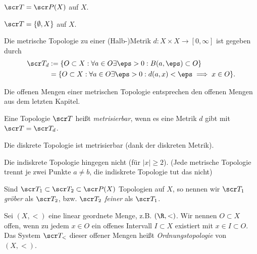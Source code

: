 \begin{ex}
	$\scr T = \scr P(X)$ auf $X$.
\end{ex}

\begin{ex}
	$\scr T = \{\emptyset, X\}$ auf $X$.
\end{ex}

\begin{ex} \label{ex:metric_topology}
	Die metrische Topologie zu einer (Halb-)Metrik $d: X \times X \to [0,\infty]$ ist gegeben durch
	\begin{align*}
		\scr T_d
		&:= \{ O \subset X : \forall a \in O \exists \eps > 0 : B(a,\eps) \subset O \} \\
		&= \{ O \subset X : \forall a \in O \exists \eps > 0 : d(a,x) < \eps \implies x \in O \}.
	\end{align*}
\end{ex}

\begin{nt}
	Die offenen Mengen einer metrischen Topologie entsprechen den offenen Mengen aus dem letzten Kapitel.
\end{nt}

\begin{df}
	Eine Topologie $\scr T$ heißt \emph{metrisierbar}, wenn es eine Metrik $d$ gibt mit $\scr T = \scr T_d$.
\end{df}

\begin{ex}
	Die diskrete Topologie ist metrisierbar (dank der diskreten Metrik).

	Die indiskrete Topologie hingegen nicht (für $|x| \ge 2$).
	(Jede metrische Topologie trennt je zwei Punkte $a \neq b$, die indiskrete Topologie tut das nicht)
\end{ex}

\begin{df}
	Sind $\scr T_1 \subset \scr T_2 \subset \scr P(X)$ Topologien auf $X$, so nennen wir $\scr T_1$ \emph{gröber} als $\scr T_2$, bzw. $\scr T_2$ \emph{feiner} als $\scr T_1$.
\end{df}

\begin{ex}[Ordnungstopologie]
	Sei $(X,<)$ eine linear geordnete Menge, z.B. $(\R,<)$.
	Wir nennen $O \subset X$ offen, wenn zu jedem $x \in O$ ein offenes Intervall $I \subset X$ existiert mit $x \in I \subset O$.
	Das System $\scr T_<$ dieser offener Mengen heißt \emph{Ordnungstopologie} von $(X,<)$.
\end{ex}

